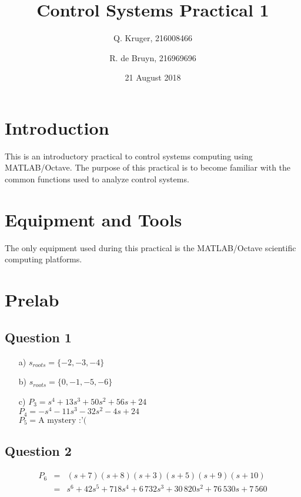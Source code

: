 \documentclass[12pt, a4paper]{article}
\title{Control Systems Practical 1}
\date{21 August 2018}
\author{Q. Kruger, 216008466 \and R. de Bruyn, 216969696}
\begin{document}
	\maketitle
	\newpage
	\tableofcontents
	\newpage
	
	\section{Introduction} %
	\label{sec:introduction}
		This is an introductory practical to control systems computing using MATLAB/Octave. The purpose of this practical is to become familiar with the common functions used to analyze control systems.

	\section{Equipment and Tools} %
	\label{sec:equipment_and_tools}
		The only equipment used during this practical is the MATLAB/Octave scientific computing platforms.

	\section{Prelab} %
	\label{sec:prelab}
		\subsection*{Question 1} %
		\label{sub:question_1}
			\begin{itemize}
				\item[a)] $s_{roots} = \{-2,-3,-4\}$
				\item[b)] $s_{roots} = \{0,-1,-5,-6\}$
				\item[c)] $P_3 = s^4 + 13s^3 + 50s^2 + 56s + 24$\\
						  $P_4 = -s^4 -11s^3 -32s^2 -4s + 24$ \\
						  $P_5 = \text{A mystery :'(}$
			\end{itemize}

		\subsection*{Question 2} %
		\label{sub:question_2}
			\begin{equation}
				\begin{array}{rcl}
					P_6 & = & (s+7)(s+8)(s+3)(s+5)(s+9)(s+10) \\
					& = & s^6 + 42s^5 +718s^4 + 6\,732s^3 + 30\,820s^2 + 76\,530s + 7\,560
				\end{array}
			\end{equation}
\end{document}
